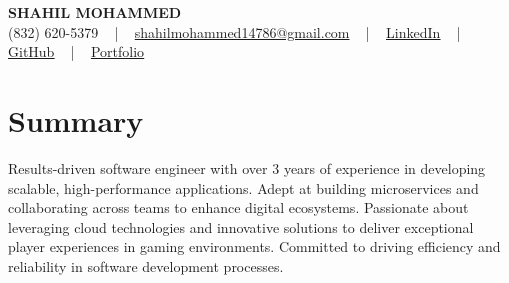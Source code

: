 \documentclass[letterpaper,10pt]{article}
\begin{document}
\begin{center}
    {\fontsize{14pt}{12pt}\selectfont \textbf{\MakeUppercase{Shahil Mohammed}}}\\ \vspace{2pt}
    \fontsize{10pt}{12pt}\selectfont (832) 620-5379 ~ | ~ \href{mailto:shahilmohammed14786@gmail.com}{shahilmohammed14786@gmail.com} ~ | ~  
    \href{https://www.linkedin.com/in/shahil-mohammed-9652931a1/}{\color{blue}\underline{LinkedIn}}  ~ | ~ 
    \href{https://github.com/freakbeast14}{\color{blue}\underline{GitHub}} ~ | ~ 
    \href{https://shahil-mohammed.netlify.app/}{\color{blue}\underline{Portfolio}}
    \vspace{-8pt}
\end{center}

\section{Summary}
\vspace{-2pt}\fontsize{8pt}{9pt}\selectfont
Results-driven software engineer with over 3 years of experience in developing scalable, high-performance applications. Adept at building microservices and collaborating across teams to enhance digital ecosystems. Passionate about leveraging cloud technologies and innovative solutions to deliver exceptional player experiences in gaming environments. Committed to driving efficiency and reliability in software development processes.
 \vspace{-5pt}
 
\vspace{-2pt}
\end{document}
